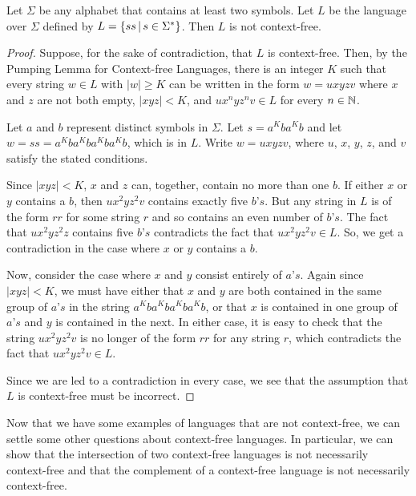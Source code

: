 \begin{corrolary}
Let $\Sigma$ be any alphabet that contains at least two symbols.
Let $L$ be the language over $\Sigma$ defined by $L=\{ss\,|\, s\in\Sigma^*\}$.
Then $L$ is not context-free.
\end{corrolary}
\begin{proof}
Suppose, for the sake of contradiction, that $L$ is
context-free.  Then, by the Pumping Lemma for Context-free Languages,
there is an integer $K$ such that every string $w\in L$ with 
$|w|\ge K$ can be written in the form $w=uxyzv$ where
$x$ and $z$ are not both empty, $|xyz|<K$, and $ux^nyz^nv\in L$
for every $n\in{\mathbb N}$.

Let $a$ and $b$ represent distinct symbols in $\Sigma$.
Let $s=a^Kba^Kb$ and let $w=ss=a^Kba^Kba^Kba^Kb$, which is in $L$.
Write $w=uxyzv$, where $u$, $x$, $y$, $z$, and $v$ satisfy the
stated conditions.

Since $|xyz|<K$, $x$ and $z$ can, together, contain no more than one $b$.  If
either $x$ or $y$ contains a $b$, then $ux^2yz^2v$ contains exactly five
$b\text{'}s$.  But any string in $L$ is of the form $rr$ for some string $r$
and so contains an even number of $b\text{'}s$.  The fact that
$ux^2yz^2z$ contains five $b\text{'}s$ contradicts the fact that $ux^2yz^2v\in L$.
So, we get a contradiction in the case where $x$ or $y$ contains a $b$.

Now, consider the case where $x$ and $y$ consist entirely of $a\text{'}s$.
Again since $|xyz|<K$, we must have either that $x$ and $y$ are both
contained in the same group of $a\text{'}s$ in the string $a^Kba^Kba^Kba^Kb$,
or that $x$ is contained in one group of $a\text{'}s$ and $y$ is contained in
the next.  In either case, it is easy to check that the string
$ux^2yz^2v$ is no longer of the form $rr$ for any string $r$,
which contradicts the fact that $ux^2yz^2v\in L$.

Since we are led to a contradiction in every case, we see that the
assumption that $L$ is context-free must be incorrect.
\end{proof}


Now that we have some examples of languages that are not context-free,
we can settle some other questions about context-free languages.
In particular, we can show that the intersection of two context-free
languages is not necessarily context-free and that the complement of
a context-free language is not necessarily context-free.

